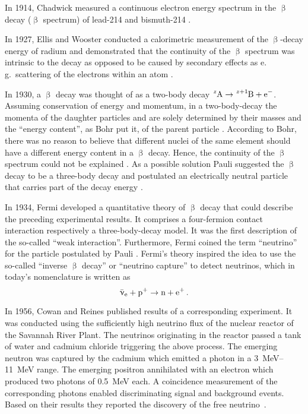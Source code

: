 In 1914, Chadwick measured a continuous electron energy spectrum in the $\upbeta$ decay ($\upbeta$ spectrum) of lead-214 and bismuth-214 \cite{Chadwick:1}. 

In 1927, Ellis and Wooster conducted a calorimetric measurement of the $\upbeta$-decay energy of radium and demonstrated that the continuity of the $\upbeta$ spectrum was intrinsic to the decay as opposed to be caused by secondary effects as e.\,g.~scattering of the electrons within an atom \cite{Ellis:1}. 

In 1930, a $\upbeta$ decay was thought of as a two-body decay $\ce{^zA} \rightarrow \ce{^{z+1}B} + \ce{e^-}$. Assuming conservation of energy and momentum, in a two-body-decay the momenta of the daughter particles  and  are solely determined by their masses and the ``energy content'', as Bohr put it, of the parent particle . According to Bohr, there was no reason to believe that different nuclei of the same element  should have a different energy content in a $\upbeta$ decay. Hence, the continuity of the $\upbeta$ spectrum could not be explained \cite{Bohr:1}. As a possible solution Pauli suggested the $\upbeta$ decay to be a three-body decay and postulated an electrically neutral particle that carries part of the decay energy \cite{Pauli1930}. 

In 1934, Fermi developed a quantitative theory of $\upbeta$ decay that could describe the preceding experimental results. It comprises a four-fermion contact interaction respectively a three-body-decay model. It was the first description of the so-called ``weak interaction''. Furthermore, Fermi coined the term ``neutrino'' for the particle postulated by Pauli \cite{Fermi1934}. Fermi's theory inspired the idea to use the so-called ``inverse $\upbeta$ decay'' or ``neutrino capture'' to detect neutrinos, which in today's nomenclature is written as
\begin{equation*}
    \aeneutrino + \ce{p^+} \rightarrow \ce{n} + \ce{e^+} \fullstop
\end{equation*}

In 1956, Cowan and Reines published results of a corresponding experiment. It was conducted using the sufficiently high neutrino flux of the nuclear reactor of the Savannah River Plant. The neutrinos originating in the reactor passed a tank of water and cadmium chloride triggering the above process. The emerging neutron was captured by the cadmium which emitted a photon in a \SIrange{3}{11}{MeV} range. The emerging positron annihilated with an electron which produced two photons of \SI{0.5}{MeV} each. A coincidence measurement of the corresponding photons enabled discriminating signal and background events. Based on their results they reported the discovery of the free neutrino~\cite{Cowan103}. 

